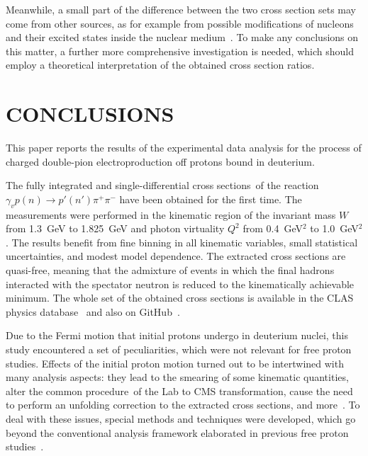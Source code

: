 \documentclass[prc,twocolumn,superscriptaddress,showpacs,amssymb,amsmath,amsfonts,aps,nofootinbib]{revtex4-1}
\begin{document}
Meanwhile, a small part of the difference between the two cross section sets may come from other sources, as for example from possible modifications of nucleons and their excited states inside the nuclear medium~\cite{Mokeev:1995fy,Bianchi:1994ax,Ahrens:1986hn,Krusche:2004xz,Noble:1980my}. To make any conclusions on this matter, a further more comprehensive investigation is needed, which should employ a theoretical interpretation of the obtained cross section ratios.




\section{CONCLUSIONS}



This paper reports the results of the experimental data analysis for the process of charged double-pion electroproduction off protons bound in deuterium.


The fully integrated and single-differential cross sections~of the reaction $\gamma_{v}p(n) \rightarrow p' (n')\pi^{+}\pi^{-}$ have been obtained for the first time. The measurements were performed in the kinematic region of the invariant mass $W$ from 1.3~GeV to 1.825~GeV and photon virtuality $Q^{2}$ from 0.4~GeV$^2$ to 1.0~GeV$^2$. The results benefit from fine binning in all kinematic variables, small statistical uncertainties, and modest model dependence. The extracted cross sections are quasi-free, meaning that the admixture of events in which the final hadrons interacted with the spectator neutron is reduced to the kinematically achievable minimum. The whole set of the obtained cross sections is available in the CLAS physics database~\cite{CLAS_DB} and also on GitHub~\cite{Github:data}.


Due to the Fermi motion that initial protons undergo in deuterium nuclei, this study encountered a set of peculiarities, which were not relevant for free proton studies. Effects of the initial proton motion turned out to be intertwined with many analysis aspects: they lead to the smearing of some kinematic quantities, alter the common procedure~of the Lab to CMS transformation, cause the need to perform an unfolding correction to the extracted cross sections, and more~\cite{my_an_note:2020, my_thesis:2021, twopeg-d}. To deal with these issues, special methods and techniques were developed, which go beyond the conventional analysis framework elaborated in previous free proton studies~\cite{Rip_an_note:2002,Ripani:2002ss,Fed_an_note:2007,Fedotov:2008aa,Isupov:2017lnd,Golovach,Arjun,Fed_an_note:2017,Fed_paper_2018}.
\end{document}
